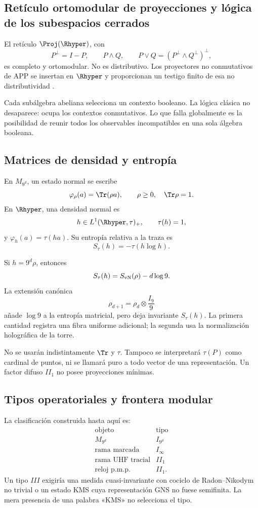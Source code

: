 \subsection{Retículo ortomodular de proyecciones y lógica de los subespacios cerrados}

El retículo \(\Proj(\Rhyper)\), con
\[
  P^\perp=I-P,
  \qquad P\wedge Q,
  \qquad P\vee Q=(P^\perp\wedge Q^\perp)^\perp,
\]
es completo y ortomodular. No es distributivo. Los proyectores
no conmutativos de APP se insertan en \(\Rhyper\) y proporcionan un testigo
finito de esa no distributividad \citep{birkhoffvonneumann1936}.

Cada subálgebra abeliana selecciona un contexto booleano. La lógica clásica
no desaparece: ocupa los contextos conmutativos. Lo que falla globalmente es
la posibilidad de reunir todos los observables incompatibles en una sola
álgebra booleana.

\subsection{Matrices de densidad y entropía}

En \(M_{9^d}\), un estado normal se escribe
\[
  \varphi_\rho(a)=\Tr(\rho a),
  \qquad \rho\ge0,\quad\Tr\rho=1.
\]
En \(\Rhyper\), una densidad normal es
\[
  h\in L^1(\Rhyper,\tau)_+,
  \qquad \tau(h)=1,
\]
y \(\varphi_h(a)=\tau(ha)\). Su entropía relativa a la traza es
\[
  S_\tau(h)=-\tau(h\log h).
\]

Si \(h=9^d\rho\), entonces
\[
  S_\tau(h)=S_{\rm vN}(\rho)-d\log9.
\]
La extensión canónica
\[
  \rho_{d+1}=\rho_d\otimes\frac{I_9}{9}
\]
añade \(\log9\) a la entropía matricial, pero deja invariante
\(S_\tau(h)\). La primera cantidad registra una fibra uniforme adicional;
la segunda usa la normalización holográfica de la torre.

\begin{controlbox}
No se usarán indistintamente \(\Tr\) y \(\tau\). Tampoco se interpretará
\(\tau(P)\) como cardinal de puntos, ni se llamará puro a todo vector de una
representación. Un factor difuso \(II_1\) no posee proyecciones mínimas.
\end{controlbox}

\subsection{Tipos operatoriales y frontera modular}

La clasificación construida hasta aquí es:
\[
\begin{array}{c|c}
\text{objeto}&\text{tipo}\\
\hline
M_{9^d}&I_{9^d}\\
\text{rama marcada}&I_\infty\\
\text{rama UHF tracial}&II_1\\
\text{reloj p.m.p.}&II_1.
\end{array}
\]
Un tipo \(III\) exigiría una medida cuasi-invariante con cociclo de
Radon--Nikodym no trivial o un estado KMS cuya representación GNS no fuese
semifinita. La mera presencia de una palabra «KMS» no selecciona el tipo.


